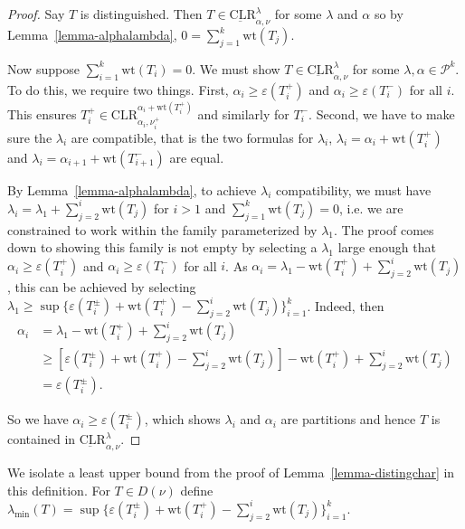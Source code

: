 \documentclass[11pt]{article}
\theoremstyle{definition}
\numberwithin{equation}{section}
\newcommand{\Par}{\mathcal{P}}
\newcommand{\wt}{\text{wt}}
\newcommand{\CLR}{\text{CLR}}
\begin{document}
\begin{proof}
    Say $T$ is distinguished. Then $T \in \underbar{\CLR}^\lambda_{\alpha, \nu}$ for some $\lambda$ and $\alpha$ so by Lemma~\ref{lemma-alphalambda}, $0 = \sum_{j=1}^{k} \wt(T_j)$.

    Now suppose $\sum_{i=1}^k \wt(T_i) = 0$. We must show $T \in \underbar{\CLR}^\lambda_{\alpha, \nu}$ for some $\lambda, \alpha \in \Par^k$. To do this, we require two things. First, $\alpha_i \geq \varepsilon(T_i^+)$ and $\alpha_i \geq \varepsilon(T_i^-)$ for all $i$. This ensures $T_i^+ \in \CLR_{\alpha_i, \nu_i^+}^{\alpha_i+\wt(T_i^+)}$ and similarly for $T_i^-$. Second, we have to make sure the $\lambda_i$ are compatible, that is the two formulas for $\lambda_i$, $\lambda_i = \alpha_i + \wt(T_i^+)$ and $\lambda_i = \alpha_{i+1}+ \wt(T_{i+1}^-)$ are equal.

    By Lemma~\ref{lemma-alphalambda}, to achieve $\lambda_i$ compatibility, we must have $\lambda_i = \lambda_1 + \sum_{j=2}^{i} \wt(T_j)$ for $i > 1$ and $\sum_{j=1}^k \wt(T_j) = 0$, i.e. we are constrained to work within the family parameterized by $\lambda_1$. The proof comes down to showing this family is not empty by selecting a $\lambda_1$ large enough that $\alpha_i \geq \varepsilon(T_i^+)$ and $\alpha_i \geq \varepsilon(T_i^-)$ for all $i$. As $\alpha_i = \lambda_1 - \wt(T_i^+) + \sum_{j=2}^{i} \wt(T_j)$, this can be achieved by selecting $\lambda_1 \geq \sup \{\varepsilon(T_i^\pm) + \wt(T_i^+) - \sum_{j=2}^{i} \wt(T_j)\}_{i=1}^k$. Indeed, then 
\begin{align*}
\alpha_i &= \lambda_1 - \wt(T_i^+) + \sum_{j=2}^{i} \wt(T_j)\\
&\geq [\varepsilon(T_i^\pm) + \wt(T_i^+) - \sum_{j=2}^{i} \wt(T_j)] - \wt(T_i^+) + \sum_{j=2}^{i} \wt(T_j)\\
&= \varepsilon(T_i^\pm).
\end{align*}
    
    So we have $\alpha_i \geq \varepsilon(T_i^\pm)$, which shows $\lambda_i$ and $\alpha_i$ are partitions and hence $T$ is contained in $\underbar{\CLR}^\lambda_{\alpha, \nu}$.

    \end{proof}

\begin{defn}
    We isolate a least upper bound from the proof of Lemma~\ref{lemma-distingchar} in this definition. For $T \in D(\nu)$ define $\lambda_{\min}(T) = \sup \{\varepsilon(T_i^\pm) + \wt(T_i^+) - \sum_{j=2}^{i} \wt(T_j)\}_{i=1}^k$.
\end{defn}
\end{document}
